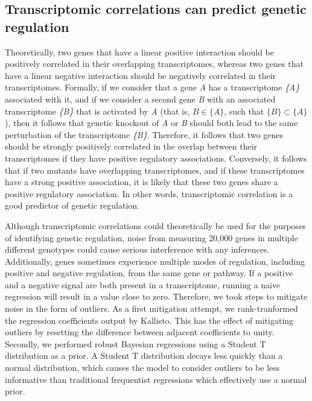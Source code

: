 \documentclass[9pt,twocolumn,twoside]{pnas-new}
\begin{document}
\subsection{Transcriptomic correlations can predict genetic regulation}
\label{sub:Transcriptomic genetic analyses}

Theoretically, two genes that have a linear positive interaction should be positively correlated in their overlapping transcriptomes, whereas two genes that have a linear negative interaction should be negatively correlated in their transcriptomes. Formally, if we consider that a gene \emph{A} has a transcriptome \emph{\{A\}} associated with it, and if we consider a second gene \emph{B} with an associated transcriptome \emph{\{B\}} that is activated by \emph{A} (that is, $B \in \{A\}$, such that $\{B\} \subset \{A\}$), then it follows that genetic knockout of \emph{A} or \emph{B} should both lead to the same perturbation of the transcriptome \emph{\{B\}}.
Therefore, it follows that two genes should be strongly positively correlated in the overlap between their transcriptomes if they have positive regulatory associations. Conversely, it follows that if two mutants have overlapping transcriptomes, and if these transcriptomes have a strong positive association, it is likely that these two genes share a positive regulatory association. In other words, transcriptomic correlation is a good predictor of genetic regulation.

Although transcriptomic correlations could theoretically be used for the purposes of identifying genetic regulation, noise from measuring 20,000 genes in multiple different genotypes could cause serious interference with any inferences. Additionally, genes sometimes experience multiple modes of regulation, including positive and negative regulation, from the same gene or pathway. If a positive and a negative signal are both present in a transcriptome, running a naive regression will result in a value close to zero.
Therefore, we took steps to mitigate noise in the form of outliers. As a first mitigation attempt, we rank-tranformed the regression coefficients output by Kallisto. This has the effect of mitigating outliers by resetting the difference between adjacent coefficients to unity. Secondly, we performed robust Bayesian regressions using a Student T distribution as a prior. A Student T distribution decays less quickly than a normal distribution, which causes the model to consider outliers to be less informative than traditional frequentist regressions which effectively use a normal prior.
\end{document}
